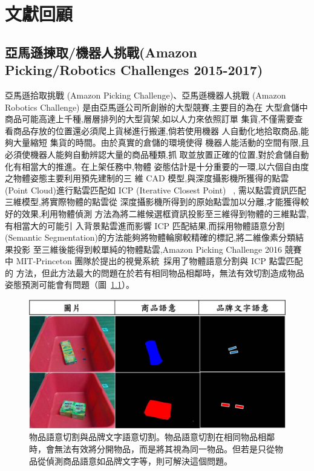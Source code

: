 \chapter{文獻回顧}
\label{chapter:relate-work}

\section{亞馬遜揀取/機器人挑戰(Amazon Picking/Robotics Challenges 2015-2017)}
亞馬遜拾取挑戰 (Amazon Picking Challenge)、亞馬遜機器人挑戰 (Amazon
Robotics Challenge) 是由亞馬遜公司所創辦的大型競賽,主要目的為在
大型倉儲中商品可能高達上千種,層層排列的大型貨架,如以人力來依照訂單
集貨,不僅需要查看商品存放的位置還必須爬上貨梯進行搬運,倘若使用機器
人自動化地拾取商品,能夠大量縮短 集貨的時間。由於真實的倉儲的環境使得
機器人能活動的空間有限,且必須使機器人能夠自動辨認大量的商品種類,抓
取並放置正確的位置,對於倉儲自動化有相當大的推進。在上架任務中,物體
姿態估計是十分重要的一環,以六個自由度之物體姿態主要利用預先建制的三
維 CAD 模型,與深度攝影機所獲得的點雲(Point Cloud)進行點雲匹配如 ICP
(Iterative Closest Point) ~\cite{pomerleau2013comparing},
需以點雲資訊匹配三維模型,將實際物體的點雲從
深度攝影機所得到的原始點雲加以分離,才能獲得較好的效果,利用物體偵測
方法為將二維候選框資訊投影至三維得到物體的三維點雲,有相當大的可能引
入背景點雲進而影響 ICP 匹配結果,而採用物體語意分割(Semantic
Segmentation)的方法能夠將物體輪廓較精確的標記,將二維像素分類結果投影
至三維後能得到較單純的物體點雲,Amazon Picking Challenge 2016 競賽中
MIT-Princeton 團隊於提出的視覺系統~\cite{zeng2016multi}採用了物體語意分割與 ICP 點雲匹配的
方法，但此方法最大的問題在於若有相同物品相鄰時，無法有效切割造成物品姿態預測可能會有問題（圖~\ref{figure:product_vs_bn}）。

\begin{figure}[ht]
	\centering
	\includegraphics[height=!, width=0.8\linewidth, keepaspectratio=true]
	{./figures/product_vs_bn.jpg}
  \caption{物品語意切割與品牌文字語意切割。物品語意切割在相同物品相鄰時，會無法有效將分開物品，而是將其視為同一物品。但若是只從物品從偵測商品語意如品牌文字等，則可解決這個問題。}
  \label{figure:product_vs_bn}
\end{figure}


